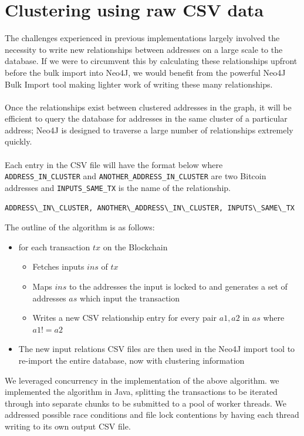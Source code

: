 \section{Clustering using raw CSV data}\label{clustering-raw-csv}
The challenges experienced in previous implementations largely involved the necessity to write new relationships between addresses on a large scale to the database. If we were to circumvent this by calculating these relationships upfront before the bulk import into Neo4J, we would benefit from the powerful Neo4J Bulk Import tool making lighter work of writing these many relationships. 
\\\\
Once the relationships exist between clustered addresses in the graph, it will be efficient to query the database for addresses in the same cluster of a particular address;  Neo4J is designed to traverse a large number of relationships extremely quickly. 
\\\\
Each entry in the CSV file will have the format below where \texttt{ADDRESS\_IN\_CLUSTER} and \texttt{ANOTHER\_ADDRESS\_IN\_CLUSTER} are two Bitcoin addresses and \texttt{INPUTS\_SAME\_TX} is the name of the relationship. 

\begin{lstlisting}
ADDRESS\_IN\_CLUSTER, ANOTHER\_ADDRESS\_IN\_CLUSTER, INPUTS\_SAME\_TX
\end{lstlisting}

The outline of the algorithm is as follows:
\begin{itemize}
    \item for each transaction $tx$ on the Blockchain
    \begin{itemize}
        \item Fetches inputs $ins$ of $tx$
        \item Maps $ins$ to the addresses the input is locked to and generates a set of addresses $as$ which input the transaction 
        \item Writes a new CSV relationship entry for every pair $a1, a2$ in $as$ where $a1 != a2$
    \end{itemize}
    \item The new input relations CSV files are then used in the Neo4J import tool to re-import the entire database, now with clustering information
\end{itemize}
We leveraged concurrency in the implementation of the above algorithm. we implemented the algorithm in Java, splitting the transactions to be iterated through into separate chunks to be submitted to a pool of worker threads. We addressed possible race conditions and file lock contentions by having each thread writing to its own output CSV file.  